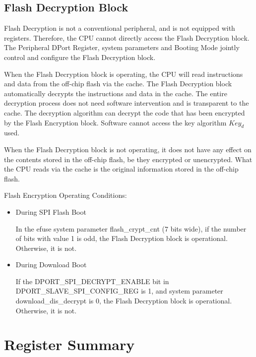 \documentclass[main\_\_EN.tex]{subfiles}
\begin{document}
\subsection{Flash Decryption Block}

Flash Decryption is not a conventional peripheral, and is not equipped with registers. Therefore, the CPU cannot directly access the Flash Decryption block. The Peripheral DPort Register, system parameters and Booting Mode jointly control and configure the Flash Decryption block.

When the Flash Decryption block is operating, the CPU will read instructions and data from the off-chip flash via the cache.
The Flash Decryption block automatically decrypts the instructions and data in the cache. The entire decryption process does not need software intervention and is transparent to the cache.
The decryption algorithm can decrypt the code that has been encrypted by the Flash Encryption block. Software cannot access the key algorithm \begin{math}Key_{d}\end{math} used.

When the Flash Decryption block is not operating, it does not have any effect on the contents stored in the off-chip flash, be they encrypted or unencrypted. What the CPU reads via the cache is the original information stored in the off-chip flash.

Flash Encryption Operating Conditions:

\begin{itemize}

    \item During SPI Flash Boot

    In the efuse system parameter flash\_crypt\_cnt (7 bits wide), if the number of bits with value 1 is odd,
    the Flash Decryption block is operational. Otherwise, it is not.

    \item During Download Boot

    If the DPORT\_SPI\_DECRYPT\_ENABLE bit in DPORT\_SLAVE\_SPI\_CONFIG\_REG is 1, and system parameter download\_dis\_decrypt is 0, the Flash Decryption block is operational. Otherwise, it is not.
\end{itemize}

\hypertarget{extmemencr-reg-summ}{}
\section{Register Summary}
\label{sec:flash-reg-sum}
\end{document}
